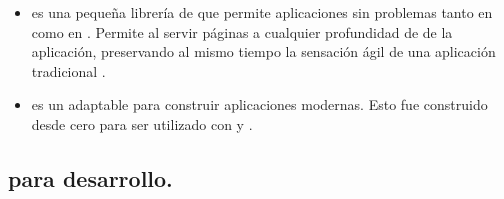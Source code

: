 \begin{itemize}
		\item
			\textbf{\rendrNAME} es una pequeña librería de \airbnbNAME \cite{online_technology_airbnb_officialsite} que permite \runCPT aplicaciones \backbonejsNAME sin problemas tanto en \clientSideAS como en \serverSideAS. Permite al \webserverINT servir páginas \htmlNAME \fullyFormedCPT a cualquier profundidad de \linkINT de la aplicación, preservando al mismo tiempo la sensación ágil de una aplicación \mvcAS \clientSideAS \backbonejsNAME tradicional \cite{online_technology_isomorphic_javascript_frameworks}.
		\item
			\textbf{\flatironNAME} es un \frameworkPC adaptable para construir aplicaciones \webINT modernas. Esto fue construido desde cero para ser utilizado con \javaScriptNAME y \nodejsNAME \cite{online_technology_flatiron_officialsite}.

	\end{itemize}

	

\subsection{\toolsCPT para desarrollo.}

